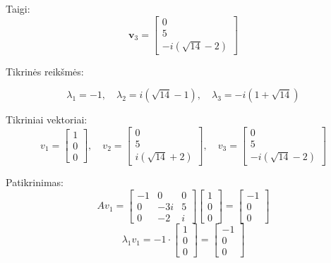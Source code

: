 \documentclass{article}
\begin{document}
Taigi:
\[
\mathbf{v}_3 = \begin{bmatrix} 0 \\ 5 \\ -i(\sqrt{14} - 2) \end{bmatrix}
\]


Tikrinės reikšmės:

\[
\lambda_1 = -1, \quad \lambda_2 = i(\sqrt{14} - 1), \quad \lambda_3 = -i(1 + \sqrt{14})
\]

Tikriniai vektoriai:
\[
{v}_1 = \begin{bmatrix} 1 \\ 0 \\ 0 \end{bmatrix}, \quad
{v}_2 = \begin{bmatrix} 0 \\ 5 \\ i(\sqrt{14} + 2) \end{bmatrix}, \quad
{v}_3 = \begin{bmatrix} 0 \\ 5 \\ -i(\sqrt{14} - 2) \end{bmatrix}
\]

Patikrinimas:
\[
    Av_1 = 
    \begin{bmatrix}
-1 & 0 & 0 \\
0 & -3i & 5 \\
0 & -2 & i
\end{bmatrix}
\begin{bmatrix}
    1 \\ 0 \\ 0
\end{bmatrix}
= 
\begin{bmatrix}
    -1 \\ 0 \\ 0
\end{bmatrix}
\]
\[
    \lambda_1 v_1 = 
-1 \cdot
\begin{bmatrix}
    1 \\ 0 \\ 0
\end{bmatrix}
= 
\begin{bmatrix}
    -1 \\ 0 \\ 0
\end{bmatrix}
\]
\end{document}
